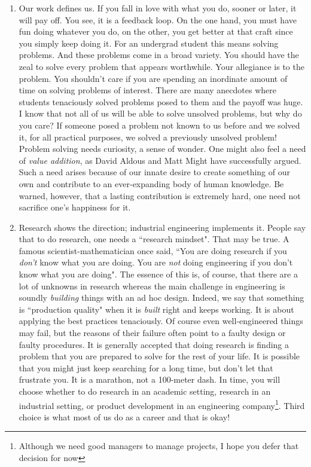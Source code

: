 \documentclass[a6paper]{article}
\begin{document}
\begin{enumerate}
    \item Our work defines us. If you fall in love with what you do, sooner or later, it will pay off. You see, it is a feedback loop. On the one hand, you must have fun doing whatever you do, on the other, you get better at that craft since you simply keep doing it. For an undergrad student this means solving problems. And these problems come in a broad variety. You should have the zeal to solve every problem that appears worthwhile. Your allegiance is to the problem. You shouldn't care if you are spending an inordinate amount of time on solving problems of interest. There are many anecdotes where students tenaciously solved problems posed to them and the payoff was huge. I know that not all of us will be able to solve unsolved problems, but why do you care? If someone posed a problem not known to us before and we solved it, for all practical purposes, we solved a previously unsolved problem! Problem solving needs curiosity, a sense of wonder. One might also feel a need of \emph{value addition}, as David Aldous \cite{david} and Matt Might \cite{matt} have successfully argued. Such a need arises because of our innate desire to create something of our own and contribute to an ever-expanding body of human knowledge. Be warned, however, that a lasting contribution is extremely hard, one need not sacrifice one's happiness for it.
    \item Research shows the direction; industrial engineering implements it. People say that to do research, one needs a ``research mindset". That may be true. A famous scientist-mathematician \cite{hamming} once said, ``You are doing research if you \emph{don't} know what you are doing. You are \emph{not} doing engineering if you don't know what you are doing". The essence of this is, of course, that there are a lot of unknowns in research whereas the main challenge in engineering is soundly \emph{building} things with an ad hoc design. Indeed, we say that something is ``production quality" when it is \emph{built} right and keeps working. It is about applying the best practices tenaciously. Of course even well-engineered things may fail, but the reasons of their failure often point to a faulty design or faulty procedures.  It is generally accepted that doing research is finding a problem that you are prepared to solve for the rest of your life. It is possible that you might just keep searching for a long time, but don't let that frustrate you. It is a marathon, not a 100-meter dash. In time, you will choose whether to do research in an academic setting, research in an industrial setting, or product development in an engineering company\footnote{Although we need good managers to manage projects, I hope you defer that decision for now}. Third choice is what most of us do as a career and that is okay!

\end{enumerate}
\end{document}

